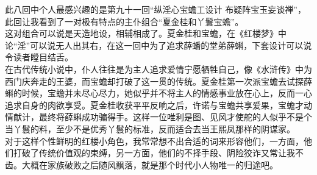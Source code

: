 %
\begin{solution}
    \large 此八回中个人最感兴趣的是第九十一回“纵淫心宝蟾工设计 布疑阵宝玉妄谈禅”，此回让我看到了一对极有特点的主仆组合“夏金桂和丫鬟宝蟾”。\\
    这对组合可以说是天造地设，相辅相成了。夏金桂和宝蟾，在《红楼梦》中论“淫”可以说无人出其右，在这一回中为了追求薛蟠的堂弟薛蝌，下套设计可以说令读者瞠目结舌。\\
    在古代传统小说中，仆人往往是为主人追求爱情宁愿牺牲自己，像《水浒传》中为西门庆奔走的王婆，而宝蟾却打破了这一贯的传统。夏金桂第一次派宝蟾去试探薛蝌的时候，宝蟾并未尽心尽力，她似乎并不将主人的情感事业放在心上，反而一心追求自身的肉欲享受。夏金桂收获平平反响之后，许诺与宝蟾共享爱果，宝蟾才动情献计，最终将薛蝌成功骗得手。这样一位唯利是图、见风才使舵的人似乎不是个当丫鬟的料，至少不是优秀丫鬟的标准，反而适合去当王熙凤那样的阴谋家。\\
    对于这样个性鲜明的红楼小角色，我常常想不出合适的词来形容他们，一方面，他们打破了传统价值观的束缚，另一方面，他们的不择手段、阴险狡诈又常让我不齿。大概在家族破败之后随风飘落，就是那个时代小人物唯一的归途吧。
\end{solution}


%



%



%

